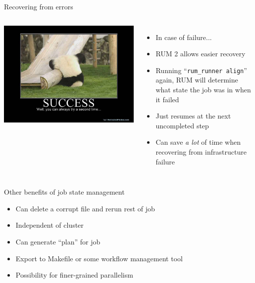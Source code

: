 \documentclass{beamer}
\begin{document}
\begin{frame}{Recovering from errors}
  \begin{columns}[c]
    \column{2in}
    \includegraphics[scale=0.2]{success.jpg}
    \column{2.5in}
    \begin{itemize}
      
      \pause
    \item In case of failure...
      \pause
    \item RUM 2 allows easier recovery
      \pause
    \item Running ``\texttt{rum\_runner align}'' again, RUM will determine what state the job was in when it failed
      \pause
    \item Just resumes at the next uncompleted step
      \pause
    \item Can save \textit{a lot} of time when recovering from infrastructure failure

    \end{itemize}

  \end{columns}
\end{frame}

\begin{frame}{Other benefits of job state management}
  \begin{itemize}
  \item Can delete a corrupt file and rerun rest of job
  \item Independent of cluster
  \item Can generate ``plan'' for job
  \item Export to Makefile or some workflow management tool
  \item Possibility for finer-grained parallelism
  \end{itemize}
\end{frame}
\end{document}
